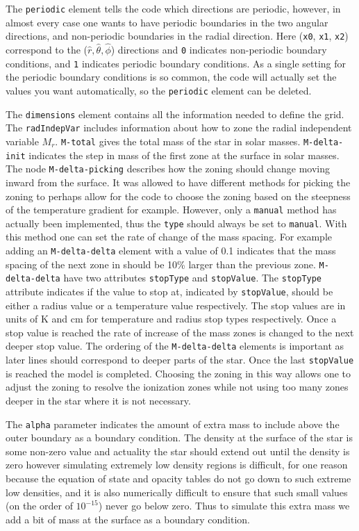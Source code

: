 \documentclass[12pt,a4paper]{book}
\begin{document}
The {\tt periodic} element tells the code which directions are periodic, however, in almost every case one wants to have periodic boundaries in the two angular directions, and non-periodic boundaries in the radial direction. Here ({\tt x0}, {\tt x1}, {\tt x2}) correspond to the ($\hat{r},\hat{\theta},\hat{\phi}$) directions and {\tt 0} indicates non-periodic boundary conditions, and {\tt 1} indicates periodic boundary conditions. As a single setting for the periodic boundary conditions is so common, the code will actually set the values you want automatically, so the {\tt periodic} element can be deleted.

The {\tt dimensions} element contains all the information needed to define the grid. The {\tt radIndepVar} includes information about how to zone the radial independent variable $M_r$. {\tt M-total} gives the total mass of the star in solar masses. {\tt M-delta-init} indicates the step in mass of the first zone at the surface in solar masses. The node {\tt M-delta-picking} describes how the zoning should change moving inward from the surface. It was allowed to have different methods for picking the zoning to perhaps allow for the code to choose the zoning based on the steepness of the temperature gradient for example. However, only a {\tt manual} method has actually been implemented, thus the {\tt type} should always be set to {\tt manual}. With this method one can set the rate of change of the mass spacing. For example adding an {\tt M-delta-delta} element with a value of 0.1 indicates that the mass spacing of the next zone in should be 10\% larger than the previous zone. {\tt M-delta-delta} have two attributes {\tt stopType} and {\tt stopValue}. The {\tt stopType} attribute indicates if the value to stop at, indicated by {\tt stopValue}, should be either a radius value or a temperature value respectively. The stop values are in units of K and cm for temperature and radius stop types respectively. Once a stop value is reached the rate of increase of the mass zones is changed to the next deeper stop value. The ordering of the {\tt M-delta-delta} elements is important as later lines should correspond to deeper parts of the star. Once the last {\tt stopValue} is reached the model is completed. Choosing the zoning in this way allows one to adjust the zoning to resolve the ionization zones while not using too many zones deeper in the star where it is not necessary.

The {\tt alpha} parameter indicates the amount of extra mass to include above the outer boundary as a boundary condition. The density at the surface of the star is some non-zero value and actuality the star should extend out until the density is zero however simulating extremely low density regions is difficult, for one reason because the equation of state and opacity tables do not go down to such extreme low densities, and it is also numerically difficult to ensure that such small values (on the order of $10^{-15}$) never go below zero. Thus to simulate this extra mass we add a bit of mass at the surface as a boundary condition.
\end{document}
